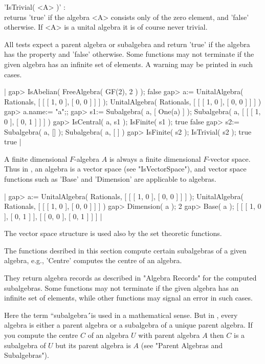 'IsTrivial( <A> )' : \\
    returns 'true' if the algebra <A> consists only of the zero element,
    and 'false' otherwise.  If <A> is a unital algebra it is of course
    never trivial.

All tests expect a parent algebra or subalgebra and return 'true' if the
algebra has the property and 'false' otherwise.  Some functions may not
terminate if the given algebra has an infinite set of elements.
A warning may be printed in such cases.

|    gap> IsAbelian( FreeAlgebra( GF(2), 2 ) );
    false
    gap> a:= UnitalAlgebra( Rationals, [ [ [ 1, 0 ], [ 0, 0 ] ] ] );
    UnitalAlgebra( Rationals, [ [ [ 1, 0 ], [ 0, 0 ] ] ] )
    gap> a.name:= "a";;
    gap> s1:= Subalgebra( a, [ One(a) ] );
    Subalgebra( a, [ [ [ 1, 0 ], [ 0, 1 ] ] ] )
    gap> IsCentral( a, s1 ); IsFinite( s1 );
    true
    false
    gap> s2:= Subalgebra( a, [] );
    Subalgebra( a, [  ] )
    gap> IsFinite( s2 ); IsTrivial( s2 );
    true
    true |


A finite dimensional $F$-algebra $A$ is always a finite dimensional
$F$-vector space.
Thus in {\GAP}, an algebra is a vector space (see "IsVectorSpace"),
and vector space functions such as 'Base' and 'Dimension' are applicable
to algebras.

|    gap> a:= UnitalAlgebra( Rationals, [ [ [ 1, 0 ], [ 0, 0 ] ] ] );
    UnitalAlgebra( Rationals, [ [ [ 1, 0 ], [ 0, 0 ] ] ] )
    gap> Dimension( a );
    2
    gap> Base( a );
    [ [ [ 1, 0 ], [ 0, 1 ] ], [ [ 0, 0 ], [ 0, 1 ] ] ] |

The vector space structure is used also by the set theoretic functions.


The functions desribed in this section compute certain  subalgebras
of  a given algebra, e.g.,  'Centre' computes  the centre of an algebra.

They return algebra records as described in "Algebra Records" for the
computed subalgebras.  Some functions may not terminate if the given
algebra has an infinite set of elements, while other functions may
signal an error in such cases.

Here the term ``subalgebra\'\'\ is used in a mathematical sense. But in
{\GAP}, every algebra is either a parent algebra or a subalgebra of a
unique parent algebra.  If you compute the centre $C$ of an algebra $U$
with parent algebra $A$ then $C$ is a subalgebra of $U$ but its parent
algebra is $A$ (see "Parent Algebras and Subalgebras").

